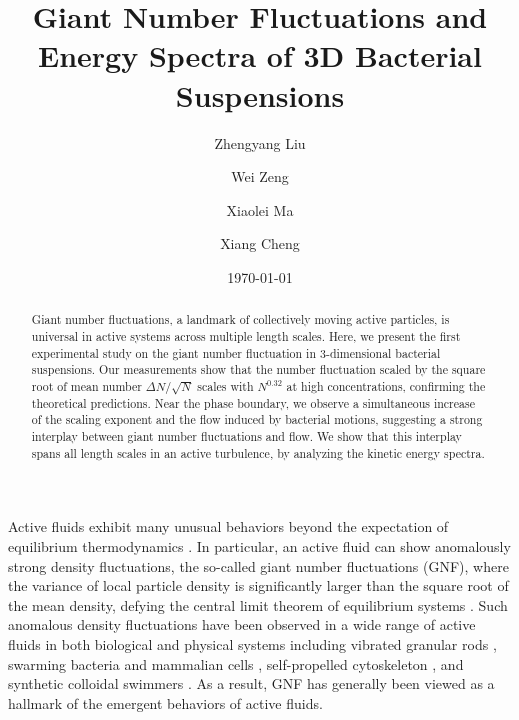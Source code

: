 \documentclass[twocolumn,aps,prl,amsmath,amssymb,longbibliography]{revtex4-2}
\begin{document}
\title{Giant Number Fluctuations and Energy Spectra of 3D Bacterial Suspensions}

\author{Zhengyang Liu}
\author{Wei Zeng}
\author{Xiaolei Ma}
\author{Xiang Cheng}



\date{\today}


\begin{abstract}
Giant number fluctuations, a landmark of collectively moving active particles, is universal in active systems across multiple length scales. Here, we present the first experimental study on the giant number fluctuation in 3-dimensional bacterial suspensions. Our measurements show that the number fluctuation scaled by the square root of mean number $\Delta N / \sqrt N$ scales with $N^{0.32}$ at high concentrations, confirming the theoretical predictions. Near the phase boundary, we observe a simultaneous increase of the scaling exponent and the flow induced by bacterial motions, suggesting a strong interplay between giant number fluctuations and flow. We show that this interplay spans all length scales in an active turbulence, by analyzing the kinetic energy spectra.

\end{abstract}

\maketitle

Active fluids exhibit many unusual behaviors beyond the expectation of equilibrium thermodynamics \cite{Ramaswamy2010,Cates2012,Marchetti2013,Poon2013,Elgeti2015}. In particular, an active fluid can show anomalously strong density fluctuations, the so-called giant number fluctuations (GNF), where the variance of local particle density is significantly larger than the square root of the mean density, defying the central limit theorem of equilibrium systems \cite{Mishin2015}. Such anomalous density fluctuations have been observed in a wide range of active fluids in both biological and physical systems including vibrated granular rods \cite{Narayan2007,Aranson2008,Deseigne2010}, swarming bacteria \cite{Zhang2010,Nishiguchi2017} and mammalian cells \cite{Kawaguchi2017}, self-propelled cytoskeleton \cite{Schaller2013}, and synthetic colloidal swimmers \cite{Palacci2013,Karani2019}. As a result, GNF has generally been viewed as a hallmark of the emergent behaviors of active fluids.
\end{document}
